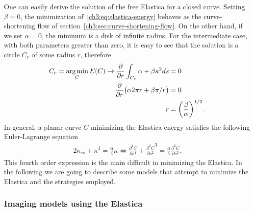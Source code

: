 One can easily derive the solution of the free Elastica for a closed curve. Setting $\beta=0$, the minimization of~\cref{ch3:eq:elastica-energy} behaves as the curve-shortening flow of section~\cref{ch3:sec:curve-shortening-flow}. On the other hand, if we set $\alpha =0$, the minimum is a disk of infinite radius. For the intermediate case, with both parameters greater than zero, it is easy to see that the solution is a circle $C_r$ of some radius $r$, therefore
\begin{align*}
	C_r = \operatorname*{arg\,min}_C E(C) \rightarrow \frac{ \partial}{\partial r} \int_{C_r}{\alpha + \beta \kappa^2 ds} &= 0 \\
	\frac{\partial}{\partial r} \big( \alpha 2\pi r + \beta \pi/r \big) & = 0 \\
	r &= \left(\frac{\beta}{\alpha}\right)^{1/2}.
\end{align*}
%
In general, a planar curve $C$ minimizing the Elastica energy satisfies the following Euler-Lagrange equation~\cite{chan02elasticainpainting,singer08lectures}
\begin{align}
		2\kappa_{ss} + \kappa^3 = \frac{\alpha}{\beta}\kappa \Leftrightarrow \frac{\partial ^4 C}{\partial s^4} + \frac{\partial ^2 C}{\partial s^2}^3 = \frac{\alpha}{\beta}\frac{\partial ^2 C}{\partial s^2}.
		\label{ch3:eq:euler-lagrange-equation-elastica}
\end{align}
%
%
This fourth order expression is the main difficult in minimizing the Elastica. In the following we are going to describe some models that attempt to minimize the Elastica and the strategies employed.

\subsubsection{Imaging models using the Elastica}

